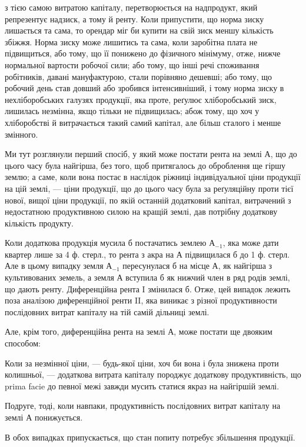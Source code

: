 \parcont{}  %
з тією самою витратою капіталу, перетворюється на надпродукт, який репрезентує
надзиск, а тому й ренту. Коли припустити, що норма зиску лишається
та сама, то орендар міг би купити на свій зиск меншу кількість збіжжя.
Норма зиску може лишитись та сама, коли заробітна плата не підвищиться,
або тому, що її понижено до фізичного мінімуму, отже, нижче нормальної вартости
робочої сили; або тому, що інші речі споживання робітників, давані мануфактурою,
стали порівняно дешевші; або тому, що робочий день став довший
або зробився інтенсивніший, і тому норма зиску в нехліборобських галузях
продукції, яка проте, реґулює хліборобський зиск, лишилась незмінна, якщо
тільки не підвищилась; абож тому, що хоч у хліборобстві й витрачається такий
самий капітал, але більш сталого і менше змінного.

Ми тут розглянули перший спосіб, у який може постати рента на землі
$А$, що до цього часу була найгірша, без того, щоб притягалось до оброблення
ще гіршу землю; а саме, коли вона постає в наслідок ріжниці індивідуальної
ціни продукції на цій землі, — ціни продукції, що до цього часу була за
реґуляційну проти тієї нової, вищої ціни продукції, по якій останній додатковий
капітал, витрачений з недостатною продуктивною силою на кращій землі,
дав потрібну додаткову кількість продукту.

Коли додаткова продукція мусила б постачатись землею $А_{-1}$, яка може дати
квартер лише за 4 ф. стерл., то рента з акра на $А$ підвищилася б до 1 ф. стерл. Але в цьому випадку
земля $А_{-1}$ пересунулася б на місце $А$, як
найгірша з культивованих земель, а земля $А$ вступила б як нижчий член в
ряд родів землі, що дають ренту. Диференційна рента I змінилася б. Отже,
цей випадок лежить поза аналізою диференційної ренти II, яка виникає з різної
продуктивности послідовних витрат капіталу на тій самій дільниці землі.

Але, крім того, диференційна рента на землі $А$, може постати ще двояким
способом:

Коли за незмінної ціни, — будь-якої ціни, хоч би вона і була знижена
проти колишньої, — додаткова витрата капіталу породжує додаткову продуктивність,
що prima facie до певної межі завжди мусить статися якраз на найгіршій
землі.

Подруге, тоді, коли навпаки, продуктивність послідовних витрат капіталу
на землі $А$ понижується.

В обох випадках припускається, що стан попиту потребує збільшення
продукції.

